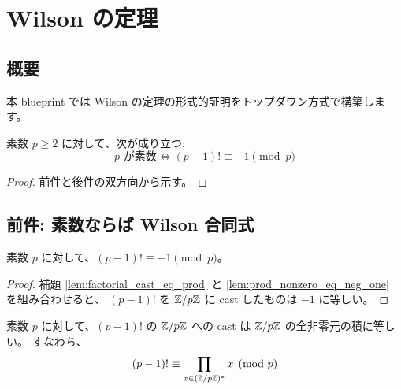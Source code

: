 \chapter{Wilson の定理}
\label{chap:wilson}

\section{概要}

本 blueprint では Wilson の定理の形式的証明をトップダウン方式で構築します。

\begin{theorem}
\label{thm:wilsons_theorem}
素数 $p \geq 2$ に対して、次が成り立つ:
\[
  p \text{ が素数} \iff (p-1)! \equiv -1 \pmod{p}
\]

\end{theorem}

\begin{proof}

前件と後件の双方向から示す。
\end{proof}

\section{前件: 素数ならば Wilson 合同式}

\begin{theorem}
\label{thm:wilsons_lemma}
素数 $p$ に対して、$(p-1)! \equiv -1 \pmod{p}$。

\end{theorem}

\begin{proof}

補題 \ref{lem:factorial_cast_eq_prod} と \ref{lem:prod_nonzero_eq_neg_one} を組み合わせると、
$(p-1)!$ を $\mathbb{Z}/p\mathbb{Z}$ に cast したものは $-1$ に等しい。
\end{proof}

\begin{lemma}
\label{lem:factorial_cast_eq_prod}
\uses{}
素数 $p$ に対して、$(p-1)!$ の $\mathbb{Z}/p\mathbb{Z}$ への cast は
$\mathbb{Z}/p\mathbb{Z}$ の全非零元の積に等しい。
すなわち、
\[
  (p-1)! \equiv \prod_{x \in (\mathbb{Z}/p\mathbb{Z})^*} x \pmod{p}
\]

\end{lemma}


